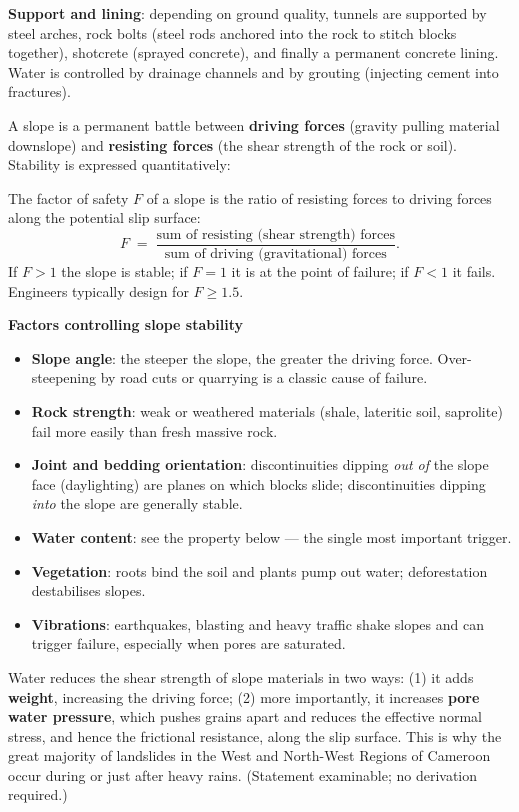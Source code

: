 \documentclass[11pt]{article}
\newcommand{\cle}[1]{{\popxbold\color{popdark}#1}}
\newcounter{popsec}
\newcounter{popsub}
\newcommand{\courssub}[1]{%
  \stepcounter{popsub}%
  \par\vspace{9pt}\noindent{\popxbold\fontsize{11.5}{13}\selectfont\color{popink}{\color{poporange}\thepopsec.\thepopsub}\hspace{6pt}#1}\par\nopagebreak\vspace{4pt}
}
\begin{document}
\textbf{Support and lining}: depending on ground quality, tunnels are supported by steel arches, \cle{rock bolts} (steel rods anchored into the rock to stitch blocks together), shotcrete (sprayed concrete), and finally a permanent concrete lining. Water is controlled by drainage channels and by grouting (injecting cement into fractures).

\courssub{Slope Stability and Mass Movement}

A slope is a permanent battle between \textbf{driving forces} (gravity pulling material downslope) and \textbf{resisting forces} (the shear strength of the rock or soil). Stability is expressed quantitatively:

\begin{definition}
The \cle{factor of safety} $F$ of a slope is the ratio of resisting forces to driving forces along the potential slip surface:
\[
F \;=\; \dfrac{\text{sum of resisting (shear strength) forces}}{\text{sum of driving (gravitational) forces}}.
\]
If $F > 1$ the slope is stable; if $F = 1$ it is at the point of failure; if $F < 1$ it fails. Engineers typically design for $F \geq 1.5$.
\end{definition}

\textbf{Factors controlling slope stability}
\begin{itemize}
\item \textbf{Slope angle}: the steeper the slope, the greater the driving force. Over-steepening by road cuts or quarrying is a classic cause of failure.
\item \textbf{Rock strength}: weak or weathered materials (shale, lateritic soil, saprolite) fail more easily than fresh massive rock.
\item \textbf{Joint and bedding orientation}: discontinuities dipping \emph{out of} the slope face (daylighting) are planes on which blocks slide; discontinuities dipping \emph{into} the slope are generally stable.
\item \textbf{Water content}: see the property below --- the single most important trigger.
\item \textbf{Vegetation}: roots bind the soil and plants pump out water; deforestation destabilises slopes.
\item \textbf{Vibrations}: earthquakes, blasting and heavy traffic shake slopes and can trigger failure, especially when pores are saturated.
\end{itemize}

\begin{propriete}
Water reduces the shear strength of slope materials in two ways: (1) it adds \textbf{weight}, increasing the driving force; (2) more importantly, it increases \textbf{pore water pressure}, which pushes grains apart and reduces the effective normal stress, and hence the frictional resistance, along the slip surface. This is why the great majority of landslides in the West and North-West Regions of Cameroon occur during or just after heavy rains. (Statement examinable; no derivation required.)
\end{propriete}
\end{document}
